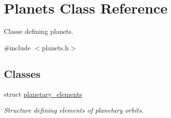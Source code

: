 \hypertarget{class_planets}{\section{Planets Class Reference}
\label{class_planets}
}


Classe defining planets.  




{\ttfamily \#include $<$planets.\-h$>$}

\subsection*{Classes}
\begin{DoxyCompactItemize}
\item 
struct \hyperlink{struct_planets_1_1planetary__elements}{planetary\-\_\-elements}
\begin{DoxyCompactList}\small\item\em Structure defining elements of planetary orbits. \end{DoxyCompactList}\end{DoxyCompactItemize}
